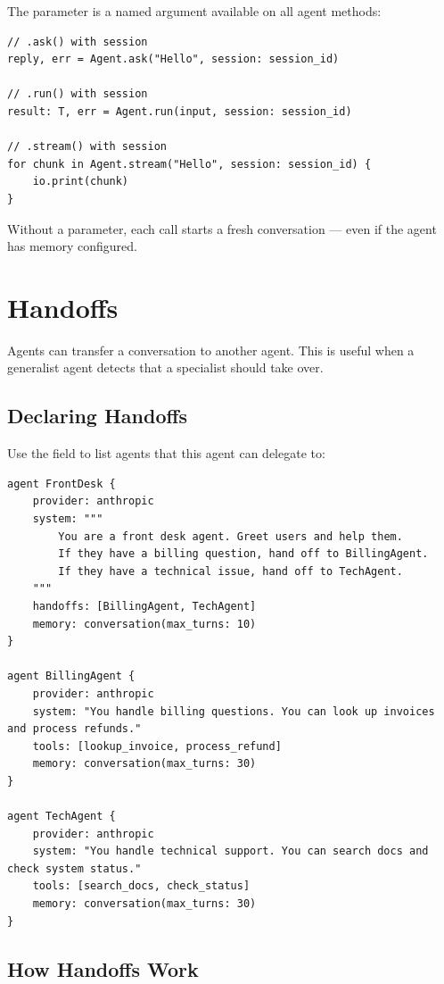The  parameter is a named argument available on all agent methods:

\begin{lstlisting}
// .ask() with session
reply, err = Agent.ask("Hello", session: session_id)

// .run() with session
result: T, err = Agent.run(input, session: session_id)

// .stream() with session
for chunk in Agent.stream("Hello", session: session_id) {
    io.print(chunk)
}
\end{lstlisting}

Without a  parameter, each call starts a fresh conversation --- even if the agent has memory configured.

\section{Handoffs}

Agents can transfer a conversation to another agent. This is useful when a generalist agent detects that a specialist should take over.

\subsection{Declaring Handoffs}

Use the  field to list agents that this agent can delegate to:

\begin{lstlisting}
agent FrontDesk {
    provider: anthropic
    system: """
        You are a front desk agent. Greet users and help them.
        If they have a billing question, hand off to BillingAgent.
        If they have a technical issue, hand off to TechAgent.
    """
    handoffs: [BillingAgent, TechAgent]
    memory: conversation(max_turns: 10)
}

agent BillingAgent {
    provider: anthropic
    system: "You handle billing questions. You can look up invoices and process refunds."
    tools: [lookup_invoice, process_refund]
    memory: conversation(max_turns: 30)
}

agent TechAgent {
    provider: anthropic
    system: "You handle technical support. You can search docs and check system status."
    tools: [search_docs, check_status]
    memory: conversation(max_turns: 30)
}
\end{lstlisting}

\subsection{How Handoffs Work}

